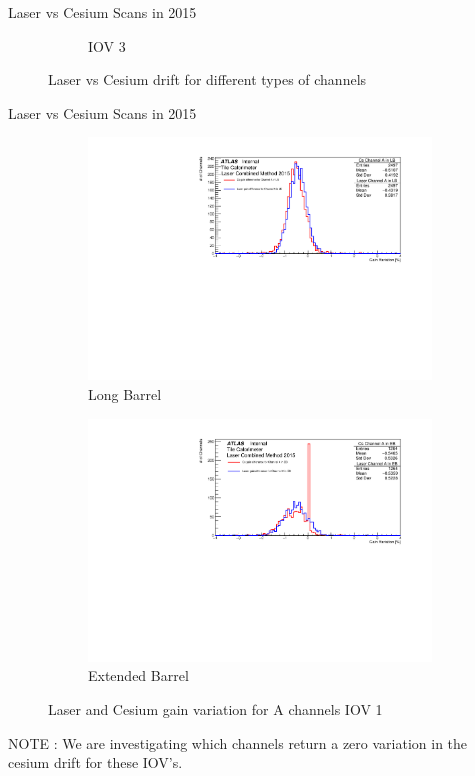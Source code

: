 \documentclass{beamer}
\begin{document}
\begin{frame}{Laser vs Cesium Scans in 2015}
\begin{figure}[H]
\begin{subfigure} [t] {0.3\textwidth}
\caption{IOV 3}
\end{subfigure}
\caption{Laser vs Cesium drift for different types of channels}
\end{figure}
\end{frame}

\begin{frame}{Laser vs Cesium Scans in 2015}
\begin{figure}[H]
\centering
\begin{subfigure} [t] {0.49\textwidth}
\includegraphics[width=\textwidth]{cs1d_a_lb_iov1.pdf}
\caption{Long Barrel}
\end{subfigure}
\begin{subfigure} [t] {0.49\textwidth}
\includegraphics[width=\textwidth]{cs1d_a_eb_iov1.pdf}
\caption{Extended Barrel}
\end{subfigure}
\caption{Laser and Cesium gain variation for A channels IOV 1}
\end{figure}
NOTE : We are investigating which channels return a zero variation in the cesium drift for these IOV's.

\end{frame}
\end{document}
